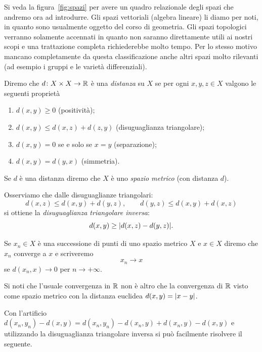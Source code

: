 Si veda la figura~\ref{fig:spazi} per avere un quadro relazionale
degli spazi che andremo ora ad introdurre.
Gli spazi vettoriali (algebra lineare) li diamo per noti, 
in quanto sono usualmente oggetto
del corso di geometria.
Gli spazi topologici verranno solamente accennati in quanto non saranno direttamente
utili ai nostri scopi e una trattazione completa richiederebbe molto tempo.
Per lo stesso motivo mancano completamente da questa classificazione anche altri
spazi molto rilevanti (ad esempio i gruppi e le varietà differenziali).


\begin{definition}
\mymark{**}
\label{def:distanza}
Diremo che $d\colon X\times X\to{\mathbb R}$ è una \emph{distanza}%
%
 su $X$
se per ogni $x,y,z\in X$ valgono le seguenti proprietà
\begin{enumerate}
\item
  $d(x,y)\ge 0$ (positività);
\item
  $d(x,y)\le d(x,z) + d(z,y)$ (disuguaglianza triangolare);
\item
  $d(x,y)=0$ se e solo se $x=y$ (separazione);
\item
  $d(x,y) = d(y,x)$ (simmetria).
\end{enumerate}

Se $d$ è una distanza
diremo che $X$ è uno
\emph{spazio metrico}
%
%
(con distanza $d$).
\end{definition}

Osserviamo che dalle disuguaglianze triangolari:
\[
  d(x,z) \le d(x,y) + d(y,z), \qquad
  d(y,z) \le d(x,y) + d(x,z)
\]
si ottiene la \emph{disuguaglianza triangolare inversa}:
\[
  d(x,y) \ge {\left|d(x,z) - d(y,z)\right|}.
\]

\begin{definition}[convergenza]%
  \label{def:convergenza_metrica}%
\mymark{*}%
Se $x_n \in X$ è una successione di punti di uno spazio metrico $X$
e $x\in X$ diremo che $x_n$ converge a $x$ e scriveremo
\[
  x_n \to x
\]
se $d(x_n,x)\to 0$ per $n\to +\infty$.
\end{definition}

Si noti che l'usuale convergenza in ${\mathbb R}$ non è altro
che la convergenza di ${\mathbb R}$
visto come spazio metrico con la distanza euclidea $d(x,y) = {\left|x-y\right|}$.

Con l'artificio $d(x_n,y_n) - d(x,y) = d(x_n,y_n) - d(x_n,y) + d(x_n,y) - d(x,y)$
e utilizzando la disuguaglianza triangolare inversa si può
facilmente risolvere il seguente.

